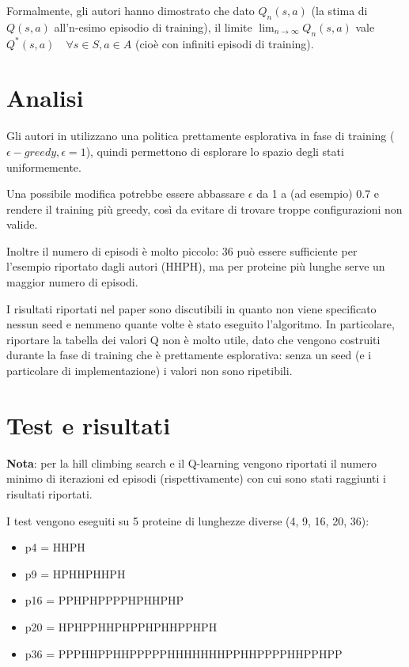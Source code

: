 \documentclass[conference]{IEEEtran}
\begin{document}
Formalmente, gli autori hanno dimostrato che dato $Q_n(s, a)$ (la stima di $Q(s,a)$ all'n-esimo episodio di training), il limite $\lim_{n \to \infty} Q_n (s,a)$ vale $Q^*(s,a) \quad \forall s \in S, a \in A$ (cioè con infiniti episodi di training).

\section{Analisi}

Gli autori in \cite{CzibulaPFP} utilizzano una politica prettamente esplorativa in fase di training ($\epsilon-greedy, \epsilon = 1$), quindi permettono di esplorare lo spazio degli stati uniformemente.

Una possibile modifica potrebbe essere abbassare $\epsilon$ da 1 a (ad esempio) 0.7 e rendere il training più greedy, così da evitare di trovare troppe configurazioni non valide.

Inoltre il numero di episodi è molto piccolo: 36 può essere sufficiente per l'esempio riportato dagli autori (HHPH), ma per proteine più lunghe serve un maggior numero di episodi.

I risultati riportati nel paper sono discutibili in quanto non viene specificato nessun seed e nemmeno quante volte è stato eseguito l'algoritmo. In particolare, riportare la tabella dei valori Q non è molto utile, dato che vengono costruiti durante la fase di training che è prettamente esplorativa: senza un seed (e i particolare di implementazione) i valori non sono ripetibili.

\section{Test e risultati}

\textbf{Nota}: per la hill climbing search  e il Q-learning vengono riportati il numero minimo di iterazioni ed episodi (rispettivamente) con cui sono stati raggiunti i risultati riportati.

I test vengono eseguiti su 5 proteine di lunghezze diverse (4, 9, 16, 20, 36):

\begin{itemize}
 \item p4 = HHPH
 \item p9 = HPHHPHHPH
 \item p16 = PPHPHPPPPHPHHPHP
 \item p20 = HPHPPHHPHPPHPHHPPHPH
 \item p36 = PPPHHPPHHPPPPPHHHHHHHPPHHPPPPHHPPHPP
\end{itemize}
\end{document}
